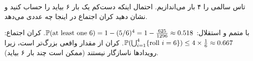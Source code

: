 \begin{exercise}
تاس سالمی را ۴ بار می‌اندازیم. احتمال اینکه دست‌کم یک بار ۶ بیاید را حساب کنید و نشان دهید کران اجتماع در اینجا چه عددی می‌دهد.
\end{exercise}
\begin{solution}
با متمم و استقلال: $\mathbb{P}(\text{at least one }6)=1-(5/6)^4=1-\frac{625}{1296}\approx0.518$.
کران اجتماع: $\mathbb{P}(\bigcup_{i=1}^4\{\text{roll } i=6\})\le 4\times\frac16\approx0.667$. کران از مقدار واقعی بزرگ‌تر است، زیرا رویدادها ناسازگار نیستند (ممکن است چند بار ۶ بیاید).
\end{solution}
